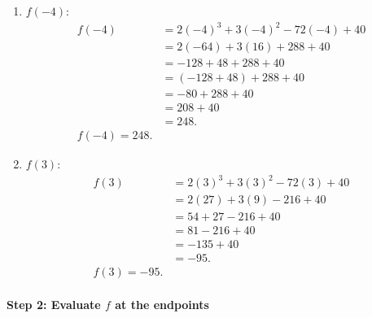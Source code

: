 \documentclass[12pt]{article}
\begin{document}
\begin{enumerate}
    \item \(f(-4)\):
    \[
    \begin{aligned}
    f(-4) &= 2(-4)^3 + 3(-4)^2 - 72(-4) + 40 \\[4pt]
           &= 2(-64) + 3(16) + 288 + 40 \\[4pt]
           &= -128 + 48 + 288 + 40 \\[4pt]
           &= (-128 + 48) + 288 + 40 \\[4pt]
           &= -80 + 288 + 40 \\[4pt]
           &= 208 + 40 \\[4pt]
           &= 248.\\[4pt]
    \boxed{f(-4) = 248.}
    \end{aligned}
    \]
    
    \item \(f(3)\):
    \[
    \begin{aligned}
    f(3) &= 2(3)^3 + 3(3)^2 - 72(3) + 40 \\[4pt]
          &= 2(27) + 3(9) - 216 + 40 \\[4pt]
          &= 54 + 27 - 216 + 40 \\[4pt]
          &= 81 - 216 + 40 \\[4pt]
          &= -135 + 40 \\[4pt]
          &= -95. \\[4pt]
    \boxed{f(3) = -95.}
    \end{aligned}
    \]
\end{enumerate}

\paragraph{Step 2: Evaluate \(f\) at the endpoints}
\end{document}
